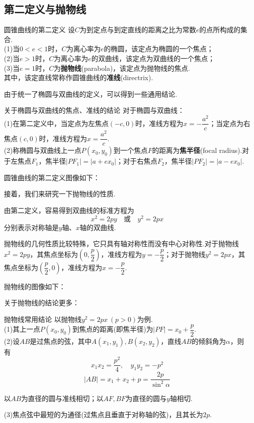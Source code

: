 \documentclass[lang=cn, zihao=5]{elegantbook}
\newcommand{\ssb}[1]{\left( #1 \right)}
\begin{document}
\subsection{第二定义与抛物线}

\begin{definition}{圆锥曲线的第二定义}
	设$C$为到定点与到定直线的距离之比为常数$e$的点所构成的集合. \\
	(1)当$0<e<1$时，$C$为离心率为$e$的椭圆，该定点为椭圆的一个焦点； \\
	(2)当$e>1$时，$C$为离心率为$e$的双曲线，该定点为双曲线的一个焦点； \\
	(3)当$e=1$时，$C$为\textbf{抛物线}(parabola)，该定点为抛物线的焦点. \\
	其中，该定直线常称作圆锥曲线的\textbf{准线}(directrix).
\end{definition}

由于统一了椭圆与双曲线的定义，可以得到一些通用结论.

\begin{proposition}{关于椭圆与双曲线的焦点、准线的结论}
	对于椭圆与双曲线： \\
	(1)在第二定义中，当定点为左焦点$(-c,0)$时，准线方程为$x=-\dfrac{a^2}{c}$；当定点为右焦点$(c,0)$时，准线方程为$x=\dfrac{a^2}{c}$. \\
	(2)称椭圆与双曲线上一点$P(x_0,y_0)$到一个焦点$F$的距离为\textbf{焦半径}(focal radius).对于左焦点$F_1$，焦半径$|PF_1|=|a+ex_0|$；对于右焦点$F_2$，焦半径$|PF_2|=|a-ex_0|$.
\end{proposition}

圆锥曲线的第二定义图像如下：


接着，我们来研究一下抛物线的性质.

由第二定义，容易得到双曲线的标准方程为$$x^2=2py \quad \textit{或} \quad y^2=2px$$
分别表示对称轴是$y$轴、$x$轴的双曲线.

抛物线的几何性质比较特殊，它只具有轴对称性而没有中心对称性.对于抛物线$x^2=2py$，其焦点坐标为$\ssb{0,\dfrac{p}{2}}$，准线方程为$y=-\dfrac{p}{2}$；对于抛物线$y^2=2px$，其焦点坐标为$\ssb{\dfrac{p}{2},0}$，准线方程为$x=-\dfrac{p}{2}$.

抛物线的图像如下：


关于抛物线的结论更多：

\begin{proposition}{抛物线常用结论}
	以抛物线$y^2=2px~(p>0)$为例. \\
	(1)其上一点$P(x_0,y_0)$到焦点的距离(即焦半径)为$|PF|=x_0+\dfrac{p}{2}$. \\
	(2)设$AB$是过焦点的弦，其中$A(x_1,y_1),B(x_2,y_2)$，直线$AB$的倾斜角为$\alpha $，则有
	$$x_1x_2=\frac{p^2}{4},\quad y_1y_2=-p^2$$
	$$|AB| = x_1+x_2+p=\frac{2p}{\sin ^2 \alpha }$$
	\begin{center}
		以$AB$为直径的圆与准线相切；以$AF,BF$为直径的圆与$y$轴相切.
	\end{center}
	(3)焦点弦中最短的为通径(过焦点且垂直于对称轴的弦)，且其长为$2p$.
\end{proposition}
\end{document}
